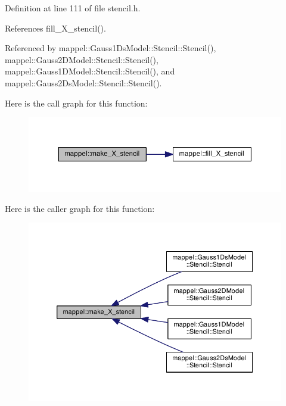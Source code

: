 Definition at line 111 of file stencil.\+h.



References fill\+\_\+\+X\+\_\+stencil().



Referenced by mappel\+::\+Gauss1\+Ds\+Model\+::\+Stencil\+::\+Stencil(), mappel\+::\+Gauss2\+D\+Model\+::\+Stencil\+::\+Stencil(), mappel\+::\+Gauss1\+D\+Model\+::\+Stencil\+::\+Stencil(), and mappel\+::\+Gauss2\+Ds\+Model\+::\+Stencil\+::\+Stencil().



Here is the call graph for this function\+:\nopagebreak
\begin{figure}[H]
\begin{center}
\leavevmode
\includegraphics[width=337pt]{namespacemappel_a7b50d0a17c085d9b25b91c2b17ecb1cc_cgraph}
\end{center}
\end{figure}




Here is the caller graph for this function\+:\nopagebreak
\begin{figure}[H]
\begin{center}
\leavevmode
\includegraphics[width=350pt]{namespacemappel_a7b50d0a17c085d9b25b91c2b17ecb1cc_icgraph}
\end{center}
\end{figure}


